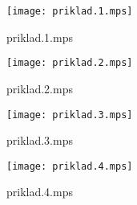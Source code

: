 \documentclass[letterpaper,10pt]{article}
\begin{document}
\begin{figure}
    \centering
    \texttt{[image: priklad.1.mps]}
    \caption{priklad.1.mps}
\end{figure}

\begin{figure}
    \centering
    \texttt{[image: priklad.2.mps]}
    \caption{priklad.2.mps}
\end{figure}

\begin{figure}
    \centering
    \texttt{[image: priklad.3.mps]}
    \caption{priklad.3.mps}
\end{figure}

\begin{figure}
    \centering
    \texttt{[image: priklad.4.mps]}
    \caption{priklad.4.mps}
\end{figure}
\end{document}
